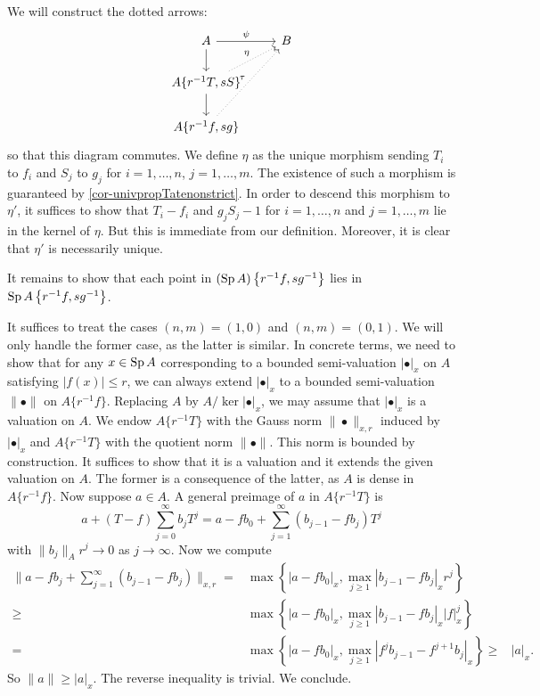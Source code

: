 \begin{example}
    We will construct the dotted arrows: 
    \[
        \begin{tikzcd}
            A \arrow[r, "\psi"] \arrow[d]                  & B \\
            {A\{r^{-1}T,sS\}} \arrow[d] \arrow[ru, dotted,"\eta"] &   \\
            {A\{r^{-1}f,sg\}} \arrow[ruu, dotted, "\tau"]          &  
        \end{tikzcd}
    \]
    so that this diagram commutes. We define $\eta$ as the unique morphism sending $T_i$ to $f_i$ and $S_j$ to $g_j$ for  $i=1,\ldots,n$, $j=1,\ldots,m$. The existence of such a morphism is guaranteed by \cref{cor-univpropTatenonstrict}. In order to descend this morphism to $\eta'$, it suffices to show that $T_i-f_i$ and $g_jS_j-1$ for $i=1,\ldots,n$ and $j=1,\ldots,m$ lie in the kernel of $\eta$. But this is immediate from our definition. Moreover, it is clear that $\eta'$ is necessarily unique.

    It remains to show that each point in $(\operatorname{Sp} A)\left\{r^{-1}f,sg^{-1}\right\}$ lies in $\operatorname{Sp} A\left\{r^{-1}f,sg^{-1}\right\}$. 
    
    It suffices to treat the cases $(n,m)=(1,0)$ and $(n,m)=(0,1)$. We will only handle the former case, as the latter is similar. In concrete terms, we need to show that for any $x\in \operatorname{Sp} A$ corresponding to a bounded semi-valuation $|\bullet|_x$ on $A$ satisfying $|f(x)|\leq r$, we can always extend $|\bullet|_x$ to a bounded semi-valuation $\|\bullet\|$ on $A\{r^{-1}f\}$.
    Replacing $A$ by $A/\ker |\bullet|_x$, we may assume that $|\bullet|_x$ is a valuation on $A$. We endow $A\{r^{-1}T\}$ with the Gauss norm $\|\bullet\|_{x,r}$ induced by $|\bullet|_x$ and $A\{r^{-1}T\}$ with the quotient norm $\|\bullet\|$. This norm is bounded by construction. It suffices to show that it is a valuation and it extends the given valuation on $A$. The former is a consequence of the latter, as $A$ is dense in $A\{r^{-1}f\}$. Now suppose $a\in A$. A general preimage of $a$ in $A\{r^{-1}T\}$ is 
    \[
        a+(T-f)\sum_{j=0}^{\infty}b_j T^j=  a-fb_0+\sum_{j=1}^{\infty} (b_{j-1}-fb_j)T^j
    \] 
    with $\|b_j\|_A r^j\to 0$ as $j\to\infty$. Now we compute
    \[
        \begin{aligned}
          \|a-fb_j+\sum_{j=1}^{\infty} (b_{j-1}-fb_j)\|_{x,r}=&\max \left\{|a-fb_0|_x, \max_{j\geq 1}|b_{j-1}-fb_j|_x r^j \right\}\\
          \geq & \max \left\{|a-fb_0|_x, \max_{j\geq 1}|b_{j-1}-fb_j|_x |f|_x^j \right\}\\
          =& \max \left\{|a-fb_0|_x, \max_{j\geq 1}|f^jb_{j-1}-f^{j+1}b_j|_x\right\}
          \geq & |a|_x.
        \end{aligned}
    \]
    So $\|a\|\geq |a|_x$. The reverse inequality is trivial. We conclude.
\end{example}

